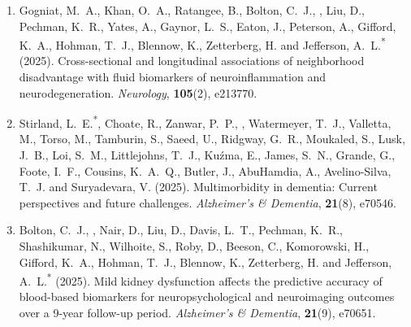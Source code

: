 \begin{enumerate}[resume=journalpubs]
\begin{pubentry}
\par\end{pubentry}
\item\begin{pubentry} Gogniat, M.\ A., Khan, O.\ A., Ratangee, B., Bolton, C.\ J., \PZnot{}, Liu, D., Pechman, K.\ R., Yates, A., Gaynor, L.\ S., Eaton, J., Peterson, A., Gifford, K.\ A., Hohman, T.\ J., Blennow, K., Zetterberg, H. and Jefferson, A.\ L.\textsuperscript{*} (2025). Cross-sectional and longitudinal associations of neighborhood disadvantage with fluid biomarkers of neuroinflammation and neurodegeneration. \emph{Neurology}, \textbf{105}(2), e213770.

\par\end{pubentry}
\item\begin{pubentry} Stirland, L.\ E.\textsuperscript{*}, Choate, R., Zanwar, P.\ P., \PZnot{}, Watermeyer, T.\ J., Valletta, M., Torso, M., Tamburin, S., Saeed, U., Ridgway, G.\ R., Moukaled, S., Lusk, J.\ B., Loi, S.\ M., Littlejohns, T.\ J., Ku\'{z}ma, E., James, S.\ N., Grande, G., Foote, I.\ F., Cousins, K.\ A.\ Q., Butler, J., AbuHamdia, A., Avelino-Silva, T.\ J. and Suryadevara, V. (2025). Multimorbidity in dementia: Current perspectives and future challenges. \emph{Alzheimer's \& Dementia}, \textbf{21}(8), e70546.


\par\end{pubentry}
\item\begin{pubentry} Bolton, C.\ J., \PZnot{}, Nair, D., Liu, D., Davis, L.\ T., Pechman, K.\ R., Shashikumar, N., Wilhoite, S., Roby, D., Beeson, C., Komorowski, H., Gifford, K.\ A., Hohman, T.\ J., Blennow, K., Zetterberg, H. and Jefferson, A.\ L.\textsuperscript{*} (2025). Mild kidney dysfunction affects the predictive accuracy of blood-based biomarkers for neuropsychological and neuroimaging outcomes over a 9-year follow-up period. \emph{Alzheimer's \& Dementia}, \textbf{21}(9), e70651.


\end{pubentry}
\end{enumerate}

